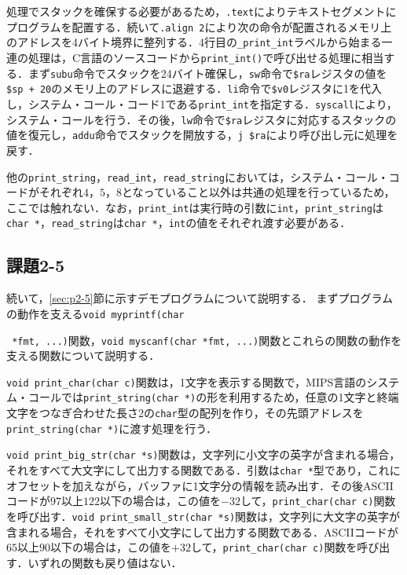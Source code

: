 処理でスタックを確保する必要があるため，\verb|.text|によりテキストセグメントにプログラムを配置する．続いて\verb|.align 2|により次の命令が配置されるメモリ上のアドレスを4バイト境界に整列する．4行目の\verb|_print_int|ラベルから始まる一連の処理は，C言語のソースコードから\verb|print_int()|で呼び出せる処理に相当する．まず\verb|subu|命令でスタックを24バイト確保し，\verb|sw|命令で\verb|$ra|レジスタの値を\verb|$sp + 20|のメモリ上のアドレスに退避する．\verb|li|命令で\verb|$v0|レジスタに1を代入し，システム・コール・コード1である\verb|print_int|を指定する．\verb|syscall|により，システム・コールを行う．その後，\verb|lw|命令で\verb|$ra|レジスタに対応するスタックの値を復元し，\verb|addu|命令でスタックを開放する，\verb|j $ra|により呼び出し元に処理を戻す．

他の\verb|print_string|，\verb|read_int|，\verb|read_string|においては，システム・コール・コードがそれぞれ$4$，$5$，$8$となっていること以外は共通の処理を行っているため，ここでは触れない．なお，\verb|print_int|は実行時の引数に\verb|int|，\verb|print_string|は\verb|char *|，\verb|read_string|は\verb|char *|，\verb|int|の値をそれぞれ渡す必要がある．



\subsection{課題2-5}
続いて，\ref{sec:p2-5}節に示すデモプログラムについて説明する．
まずプログラムの動作を支える\verb|void myprintf(char|

\noindent\verb| *fmt, ...)|関数，\verb|void myscanf(char *fmt, ...)|関数とこれらの関数の動作を支える関数について説明する．

\verb|void print_char(char c)|関数は，1文字を表示する関数で，MIPS言語のシステム・コールでは\verb|print_string(char *)|の形を利用するため，任意の1文字と終端文字をつなぎ合わせた長さ2の\verb|char|型の配列を作り，その先頭アドレスを\verb|print_string(char *)|に渡す処理を行う．

\verb|void print_big_str(char *s)|関数は，文字列に小文字の英字が含まれる場合，それをすべて大文字にして出力する関数である．引数は\verb|char *|型であり，これにオフセットを加えながら，バッファに1文字分の情報を読み出す．その後ASCIIコードが$97$以上$122$以下の場合は，この値を$-32$して，\verb|print_char(char c)|関数を呼び出す．\verb|void print_small_str(char *s)|関数は，文字列に大文字の英字が含まれる場合，それをすべて小文字にして出力する関数である．ASCIIコードが$65$以上$90$以下の場合は，この値を$+32$して，\verb|print_char(char c)|関数を呼び出す．いずれの関数も戻り値はない．

